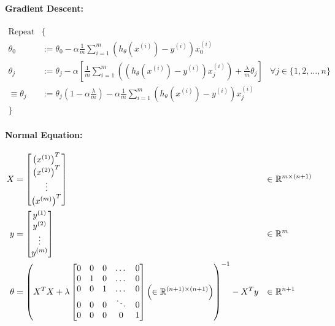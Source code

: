 \paragraph{Gradient Descent:}
\begin{align*}
    \text{Repeat}   & \{                                                             \\
    \theta_0        & :=
    \theta_0 - \alpha \frac{1}{m} \sum_{i=1}^m(h_\theta(x^{(i)}) - y^{(i)})x_0^{(i)} \\
    \theta_j        & :=
    \theta_j - \alpha \left[
    \frac{1}{m} \sum_{i=1}^m\left(
    (h_\theta(x^{(i)}) - y^{(i)})x_j^{(i)}
    \right) + \frac{\lambda}{m}\theta_j
    \right]         & \forall j \in \{1, 2, \dots, n\}                               \\
    \equiv \theta_j & :=
    \theta_j(1 - \alpha\frac{\lambda}{m}) - \alpha\frac{1}{m}\sum_{i=1}^m(
    h_\theta(x^{(i)}) - y^{(i)}
    )x_j^{(i)}                                                                       \\
    \}
\end{align*}

\paragraph{Normal Equation:}
\begin{align*}
    X                   & = \begin{bmatrix}
        \left(x^{(1)}\right)^T \\
        \left(x^{(2)}\right)^T \\
        \vdots                 \\
        \left(x^{(m)}\right)^T \\
    \end{bmatrix} & \in        & \ \R^{m\times(n+1)} \\
    y                   & = \begin{bmatrix}
        y^{(1)} \\
        y^{(2)} \\
        \vdots  \\
        y^{(m)} \\
    \end{bmatrix} & \in        & \ \R^m              \\
    \theta              & = \left(
    X^TX + \lambda \begin{bmatrix}
        0 & 0 & 0 & \dots  & 0 \\
        0 & 1 & 0 & \dots  & 0 \\
        0 & 0 & 1 & \dots  & 0 \\
        0 & 0 & 0 & \ddots & 0 \\
        0 & 0 & 0 & 0      & 1 \\
    \end{bmatrix} \left(\in \R^{(n+1)\times(n+1)}\right)
    \right)^{-1} - X^Ty & \in                          & \ \R^{n+1}                       \\
\end{align*}


